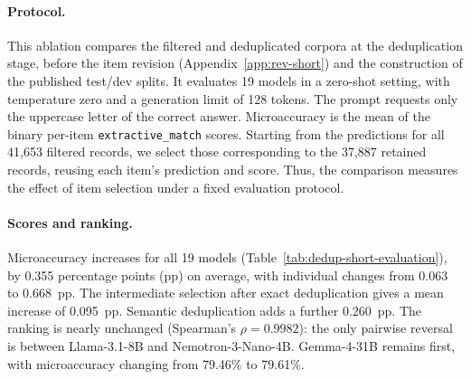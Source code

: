 \paragraph{Protocol.} This ablation compares the filtered and deduplicated
corpora at the deduplication stage, before the item revision
(Appendix~\ref{app:rev-short}) and the construction of the published test/dev
splits. It evaluates 19 models in a zero-shot setting, with
temperature zero and a generation limit of 128 tokens. The prompt requests
only the uppercase letter of the correct answer. Microaccuracy is the mean
of the binary per-item \texttt{extractive\_match} scores. Starting from the
predictions for all 41,653 filtered records, we select those corresponding
to the 37,887 retained records, reusing each item's prediction and score.
Thus, the comparison measures the effect of item selection under a fixed
evaluation protocol.

\paragraph{Scores and ranking.} Microaccuracy increases for all 19 models
(Table~\ref{tab:dedup-short-evaluation}), by 0.355 percentage points (pp) on
average, with individual changes from 0.063 to 0.668~pp. The intermediate
selection after exact deduplication gives a mean increase of 0.095~pp.
Semantic deduplication adds a further 0.260~pp. The ranking is nearly
unchanged (Spearman's $\rho=0.9982$): the only pairwise reversal is between
Llama-3.1-8B and Nemotron-3-Nano-4B. Gemma-4-31B remains first, with
microaccuracy changing from 79.46\% to 79.61\%.


